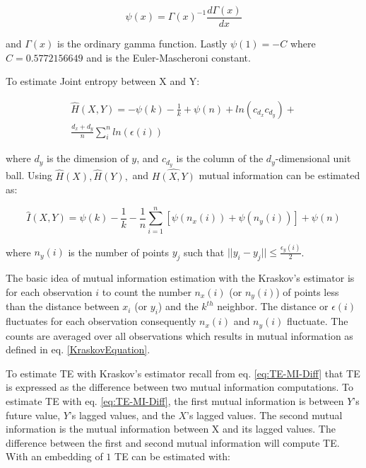 \begin{equation}
\psi(x) = \Gamma(x)^{-1} \frac{d\Gamma(x)} {dx}
\end{equation}

\noindent and  \(\Gamma(x)\) is the ordinary gamma function. Lastly \(\psi(1) = -C\) where \(C=0.5772156649\) and is the Euler-Mascheroni constant. %

To estimate Joint entropy between X and Y: 

\setlength{\arraycolsep}{0.0em}
\begin{eqnarray}
\hat{H}(X,Y) = - \psi(k) - \frac{1}{k} + \psi(n) + ln(c_{d_x} c_{d_y})  +  \nonumber\\
\frac{d_x + d_y}{n} \sum^n_i ln(\epsilon(i))
\end{eqnarray}
\setlength{\arraycolsep}{1pt}


\noindent where \(d_y\) is the dimension of \(y\), and \(c_{d_y}\) is the column of the \(d_y\)-dimensional unit ball. Using \(\hat{H}(X), \hat{H}(Y),\) and \(\hat{H(X,Y)}\) mutual information can be estimated as:

\begin{equation}
\label{KraskovEquation}
\hat{I}(X,Y) = \psi(k) - \frac{1}{k} - \frac{1}{n}  \sum_{i=1}^n [\psi(n_x(i)) + \psi(n_y(i))] + \psi(n)
\end{equation}

\noindent where \(n_y(i)\) is the number of points \(y_j\) such that \(|| y_i - y_j || \leq \frac{\epsilon_y(i)}{2} \).

The basic idea of mutual information estimation with the Kraskov's estimator is for each observation \(i\) to count the number \(n_x(i)\) (or \(n_y(i)\)) of points less than the distance between \(x_i\) (or \(y_i\)) and the \(k^{th}\) neighbor. The distance or \(\epsilon(i)\) fluctuates for each observation consequently \(n_x(i)\) and \(n_y(i)\) fluctuate. The counts are averaged over all observations which results in mutual information as defined in eq. \ref{KraskovEquation}.


To estimate TE with Kraskov's estimator recall from eq. \ref{eq:TE-MI-Diff} that TE is expressed as the difference between two mutual information computations. To estimate TE with eq. \ref{eq:TE-MI-Diff}, the first mutual information is between \(Y\)'s future value, \(Y\)'s lagged values, and the  \(X\)'s lagged values. The second mutual information is the mutual information between X and its lagged values. The difference between the first and second mutual information will compute TE. With an embedding of \(1\) TE can be estimated with: 


